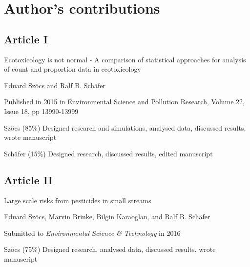 

\chapter{Author's contributions}

\thispagestyle{empty}
\begingroup
\let\clearpage\relax
\let\cleardoublepage\relax
\let\cleardoublepage\relax
\thispagestyle{empty}


\begin{sloppypar}

\section*{Article I}
\vspace{-1em}
\small
\begin{description}
    \setlength\itemsep{0em}
	\item[Title:] Ecotoxicology is not normal - A comparison of statistical approaches for analysis of count and proportion data in ecotoxicology
	\item[Authors:] Eduard Szöcs and Ralf B. Schäfer
	\item[Status:] Published in 2015 in Environmental Science and Pollution Research, Volume 22, Issue 18, pp 13990-13999
	\item[Contributions:] Szöcs (85\%) Designed research and simulations, analysed data, discussed results, wrote manuscript 

	Schäfer (15\%) Designed research, discussed results, edited manuscript
\end{description}
\normalsize
\vfill

\section*{Article II}
\vspace{-1em}
\small
\begin{description}
    \setlength\itemsep{0em}
	\item[Title:] Large scale risks from pesticides in small streams
	\item[Authors:] Eduard Szöcs, Marvin Brinke, Bilgin Karaoglan, and Ralf B. Schäfer
	\item[Status:] Submitted to \emph{Environmental Science \& Technology} in 2016
	\item[Contributions:] Szöcs (75\%) Designed research, analysed data, discussed results, wrote manuscript


\end{description}
\end{sloppypar}

